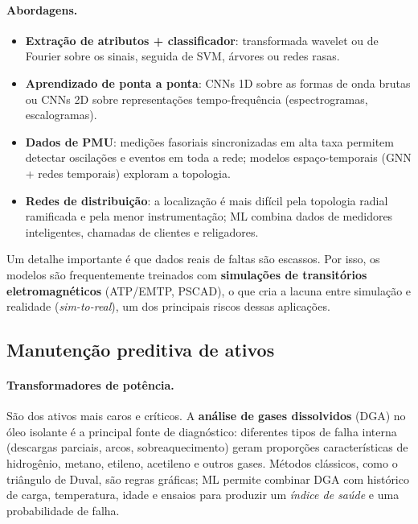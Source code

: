 \documentclass[11pt,a4paper]{article}
\begin{document}
\paragraph{Abordagens.}
\begin{itemize}
  \item \textbf{Extração de atributos + classificador}: transformada wavelet
    ou de Fourier sobre os sinais, seguida de SVM, árvores ou redes rasas.
  \item \textbf{Aprendizado de ponta a ponta}: CNNs 1D sobre as formas de onda
    brutas ou CNNs 2D sobre representações tempo-frequência (espectrogramas,
    escalogramas).
  \item \textbf{Dados de PMU}: medições fasoriais sincronizadas em alta taxa
    permitem detectar oscilações e eventos em toda a rede; modelos
    espaço-temporais (GNN + redes temporais) exploram a topologia.
  \item \textbf{Redes de distribuição}: a localização é mais difícil pela
    topologia radial ramificada e pela menor instrumentação; ML combina dados
    de medidores inteligentes, chamadas de clientes e religadores.
\end{itemize}

Um detalhe importante é que dados reais de faltas são escassos. Por isso,
os modelos são frequentemente treinados com \textbf{simulações de transitórios
eletromagnéticos} (ATP/EMTP, PSCAD), o que cria a lacuna entre simulação e
realidade (\textit{sim-to-real}), um dos principais riscos dessas aplicações.

\subsection{Manutenção preditiva de ativos}

\paragraph{Transformadores de potência.} São dos ativos mais caros e críticos.
A \textbf{análise de gases dissolvidos} (DGA) no óleo isolante é a principal
fonte de diagnóstico: diferentes tipos de falha interna (descargas parciais,
arcos, sobreaquecimento) geram proporções características de hidrogênio,
metano, etileno, acetileno e outros gases. Métodos clássicos, como o triângulo
de Duval, são regras gráficas; ML permite combinar DGA com histórico de carga,
temperatura, idade e ensaios para produzir um \textit{índice de saúde} e uma
probabilidade de falha.
\end{document}
